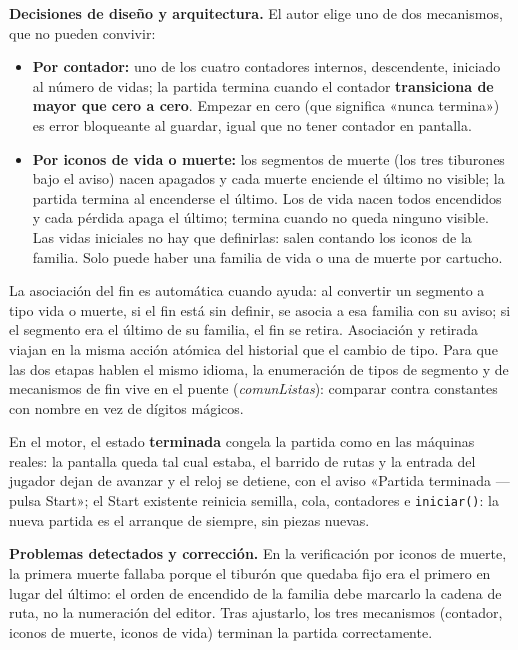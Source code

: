\textbf{Decisiones de diseño y arquitectura.} El autor elige uno de dos
mecanismos, que no pueden convivir:

\begin{itemize}
	\item \textbf{Por contador:} uno de los cuatro contadores internos,
	descendente, iniciado al número de vidas; la partida termina cuando el
	contador \textbf{transiciona de mayor que cero a cero}. Empezar en cero
	(que significa «nunca termina») es error bloqueante al guardar, igual
	que no tener contador en pantalla.
	\item \textbf{Por iconos de vida o muerte:} los segmentos de muerte
	(los tres tiburones bajo el aviso) nacen apagados y cada muerte enciende
	el último no visible; la partida termina al encenderse el último. Los
	de vida nacen todos encendidos y cada pérdida apaga el último; termina
	cuando no queda ninguno visible. Las vidas iniciales no hay que
	definirlas: salen contando los iconos de la familia. Solo puede haber
	una familia de vida o una de muerte por cartucho.
\end{itemize}

La asociación del fin es automática cuando ayuda: al convertir un
segmento a tipo vida o muerte, si el fin está sin definir, se asocia a
esa familia con su aviso; si el segmento era el último de su familia,
el fin se retira. Asociación y retirada viajan en la misma acción
atómica del historial que el cambio de tipo. Para que las dos etapas
hablen el mismo idioma, la enumeración de tipos de segmento y de
mecanismos de fin vive en el puente (\emph{comunListas}): comparar
contra constantes con nombre en vez de dígitos mágicos.

En el motor, el estado \textbf{terminada} congela la partida como en
las máquinas reales: la pantalla queda tal cual estaba, el barrido de
rutas y la entrada del jugador dejan de avanzar y el reloj se detiene,
con el aviso «Partida terminada — pulsa Start»; el Start existente
reinicia semilla, cola, contadores e \texttt{iniciar()}: la nueva
partida es el arranque de siempre, sin piezas nuevas.

\textbf{Problemas detectados y corrección.} En la verificación por
iconos de muerte, la primera muerte fallaba porque el tiburón que
quedaba fijo era el primero en lugar del último: el orden de encendido
de la familia debe marcarlo la cadena de ruta, no la numeración del
editor. Tras ajustarlo, los tres mecanismos (contador, iconos de
muerte, iconos de vida) terminan la partida correctamente.

